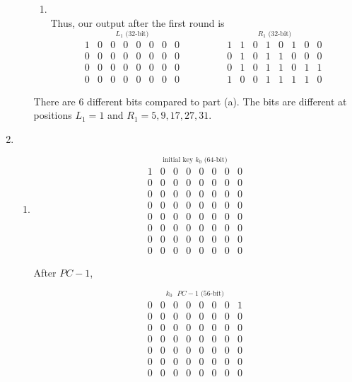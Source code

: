 \documentclass[12pt]{article}
\begin{document}
\begin{enumerate}
\begin{enumerate}
\begin{enumerate}
			\item
				\quad\\
				Thus, our output after the first round is
				\[
				\stackrel{\mbox{$L_1$ (32-bit)}}{
					\begin{matrix}
						1&0&0&0&0&0&0&0\\
						0&0&0&0&0&0&0&0\\
						0&0&0&0&0&0&0&0\\
						0&0&0&0&0&0&0&0
					\end{matrix}}\quad\quad\quad\quad
					\stackrel{\mbox{$R_1$ (32-bit)}}{
					\begin{matrix}
						1&1&0&1&0&1&0&0\\
						0&1&0&1&1&0&0&0\\
						0&1&0&1&1&0&1&1\\
						1&0&0&1&1&1&1&0
					\end{matrix}}
				\]
			\end{enumerate}
			There are 6 different bits compared to part (a). The bits are different at positions $L_1=1$ and $R_1 = 5,9,17,27,31$.
		\end{enumerate}
	\item	
		\begin{enumerate}	
		\item 
			\[
			\stackrel{\mbox{initial key $k_0$ (64-bit)}}{
				\begin{matrix}
					1&0&0&0&0&0&0&0\\ 
					0&0&0&0&0&0&0&0\\
					0&0&0&0&0&0&0&0\\
					0&0&0&0&0&0&0&0\\
					0&0&0&0&0&0&0&0\\
					0&0&0&0&0&0&0&0\\
					0&0&0&0&0&0&0&0\\
					0&0&0&0&0&0&0&0
				\end{matrix}}
			\]
			
			After $PC-1$,
			
			\[
			\stackrel{\mbox{$k_0$ $PC-1$ (56-bit)}}{
				\begin{matrix}
					0&0&0&0&0&0&0&1\\ 
					0&0&0&0&0&0&0&0\\
					0&0&0&0&0&0&0&0\\
					0&0&0&0&0&0&0&0\\
					0&0&0&0&0&0&0&0\\
					0&0&0&0&0&0&0&0\\
					0&0&0&0&0&0&0&0
				\end{matrix}}
			\]
			

\end{enumerate}
\end{enumerate}
\end{document}
